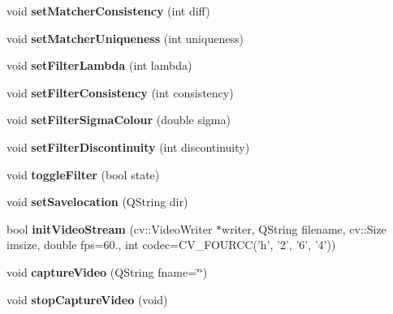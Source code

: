 \begin{DoxyCompactItemize}
\item 
\hypertarget{class_q_stereo_camera_a2ffd4235ca37b72c90ccaa8946b03688}{}void {\bfseries set\+Matcher\+Consistency} (int diff)\label{class_q_stereo_camera_a2ffd4235ca37b72c90ccaa8946b03688}

\item 
\hypertarget{class_q_stereo_camera_af5a66813cc378c0c482a83cab0f66690}{}void {\bfseries set\+Matcher\+Uniqueness} (int uniqueness)\label{class_q_stereo_camera_af5a66813cc378c0c482a83cab0f66690}

\item 
\hypertarget{class_q_stereo_camera_adfb5a91f2209d591da32c1aea590e625}{}void {\bfseries set\+Filter\+Lambda} (int lambda)\label{class_q_stereo_camera_adfb5a91f2209d591da32c1aea590e625}

\item 
\hypertarget{class_q_stereo_camera_a2d580722c27b8b5db9f98cc5ea205383}{}void {\bfseries set\+Filter\+Consistency} (int consistency)\label{class_q_stereo_camera_a2d580722c27b8b5db9f98cc5ea205383}

\item 
\hypertarget{class_q_stereo_camera_ad340b1d66ae85e58ea6d0b7358345f96}{}void {\bfseries set\+Filter\+Sigma\+Colour} (double sigma)\label{class_q_stereo_camera_ad340b1d66ae85e58ea6d0b7358345f96}

\item 
\hypertarget{class_q_stereo_camera_a504569ad87a1c84ad24f4cbb293c418f}{}void {\bfseries set\+Filter\+Discontinuity} (int discontinuity)\label{class_q_stereo_camera_a504569ad87a1c84ad24f4cbb293c418f}

\item 
\hypertarget{class_q_stereo_camera_ac6df8d763e9a3b5454d5fe070130c807}{}void {\bfseries toggle\+Filter} (bool state)\label{class_q_stereo_camera_ac6df8d763e9a3b5454d5fe070130c807}

\item 
\hypertarget{class_q_stereo_camera_a3e1379cb2eb879ad97b14543346a3c84}{}void {\bfseries set\+Savelocation} (Q\+String dir)\label{class_q_stereo_camera_a3e1379cb2eb879ad97b14543346a3c84}

\item 
\hypertarget{class_q_stereo_camera_a132cd9e1cf556224fd33a3b4385d351b}{}bool {\bfseries init\+Video\+Stream} (cv\+::\+Video\+Writer $\ast$writer, Q\+String filename, cv\+::\+Size imsize, double fps=60., int codec=C\+V\+\_\+\+F\+O\+U\+R\+C\+C('h', '2', '6', '4'))\label{class_q_stereo_camera_a132cd9e1cf556224fd33a3b4385d351b}

\item 
\hypertarget{class_q_stereo_camera_acacdf21f4b8833f672407f3465bd67a0}{}void {\bfseries capture\+Video} (Q\+String fname=\char`\"{}\char`\"{})\label{class_q_stereo_camera_acacdf21f4b8833f672407f3465bd67a0}

\item 
\hypertarget{class_q_stereo_camera_aa1841d6cfb8d6a6bf5e1a15bb9d6d085}{}void {\bfseries stop\+Capture\+Video} (void)\label{class_q_stereo_camera_aa1841d6cfb8d6a6bf5e1a15bb9d6d085}

\end{DoxyCompactItemize}
